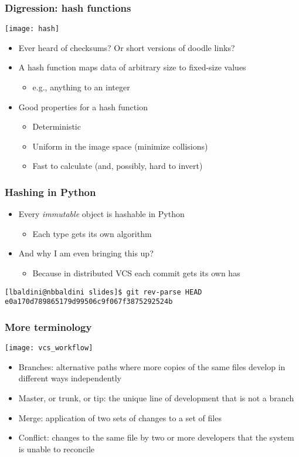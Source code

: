 \documentclass[9pt]{beamer}
\begin{document}
\begin{frame}
  \frametitle{Digression: hash functions}
  \centering\texttt{[image: hash]}
  \begin{itemize}
  \item Ever heard of checksums? Or short versions of doodle links?
  \item \alert{A hash function maps data of arbitrary size to fixed-size values}
    \begin{itemize}
    \item e.g., anything to an integer
    \end{itemize}
  \item Good properties for a hash function
    \begin{itemize}
    \item Deterministic
    \item Uniform in the image space (minimize collisions)
    \item Fast to calculate (and, possibly, hard to invert)
    \end{itemize}
  \end{itemize}
\end{frame}


\begin{frame}[fragile]
  \frametitle{Hashing in Python}
  
  \begin{itemize}
  \item Every \emph{immutable} object is hashable in Python
    \begin{itemize}
    \item Each type gets its own algorithm
    \end{itemize}
  \item And why I am even bringing this up?
    \begin{itemize}
    \item Because in distributed VCS each commit gets its own has
    \end{itemize}
  \end{itemize}
  \begin{Verbatim}
[lbaldini@nbbaldini slides]$ git rev-parse HEAD
e0a170d789865179d99506c9f067f3875292524b
  \end{Verbatim}
\end{frame}


\begin{frame}
  \frametitle{More terminology}
  \centering\texttt{[image: vcs\_workflow]}

  \begin{itemize}
  \item \alert{Branches}: alternative paths where more copies of the same files
    develop in different ways independently
  \item \alert{Master, or trunk, or tip}: the unique line of development that
    is not a branch
  \item \alert{Merge}: application of two sets of changes to a set of files
  \item \alert{Conflict}: changes to the same file by two or more developers
    that the system is unable to reconcile
  \end{itemize}
\end{frame}
\end{document}
